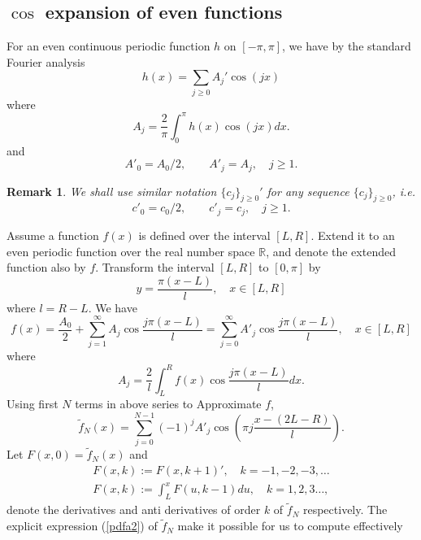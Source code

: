\documentclass[numreferences]{kluwer}    %
\newtheorem{Rem}{Remark}
\begin{document}
\begin{article}
\section{$\cos$ expansion of even functions}
For an even continuous periodic function $h$ on $[-\pi,\pi]$, we
have by the standard Fourier analysis
\[
h(x)={\sum_{j \ge 0}}A_j' \cos(jx)
\]
where
\begin{equation}\label{Aj1}
A_j=\frac{2}{\pi}\int^{\pi}_0 h(x)\cos(jx)dx.
\end{equation}
and
\begin{equation}\label{Ajp}
A'_0=A_0/2,\quad  \quad A'_j=A_j,\quad j\ge 1.
\end{equation}
\begin{Rem}
We shall use similar notation $\{c_j\}_{j\ge 0}'$ for any
sequence $\{c_j\}_{j\ge 0}$, i.e.
\begin{equation}\label{cjp}
c'_0=c_0/2,\quad  \quad c'_j=c_j,\quad j\ge 1.
\end{equation}
\end{Rem}
Assume a function $f(x)$ is defined over the interval $[L, R]$. 
Extend it to an even periodic function over the real number space
$\mathbb{R}$, and denote the extended function also by $f$.   Transform the interval $[L, R]$ to $[0, \pi]$ by
\begin{equation}\label{y}
y=\frac{\pi(x-L)}l,\quad x\in [L,R]
\end{equation}
where $l=R-L$. We have
\begin{equation}\label{fx}
f(x)=\frac{A_0}2+\sum_{j=1}^{\infty}A_j \cos\frac{j\pi(x-L)}l=\sum_{j=0}^{\infty}A'_j \cos\frac{j\pi(x-L)}l,
\quad x\in [L,R]
\end{equation}
where
\begin{equation}\label{Aj2}
A_j=\frac{2}l\int^{R}_L f(x)\cos\frac{j\pi(x-L)}l dx.
\end{equation}
Using first $N$ terms in above series to Approximate $f$, 
\begin{equation}\label{pdfa2}
\tilde{f}_N(x)=\sum_{j=0}^{N-1}(-1)^{j}A'_j \cos(\pi
j\frac{x-(2L-R)}l).
\end{equation}
Let $F(x,0)=\tilde{f}_N(x)$ and
\begin{eqnarray*}
F(x,k):=F(x,k+1)',\quad k=-1,-2,-3,\dots\\
F(x,k):=\int^{x}_{L} F(u,k-1)du, \quad k=1, 2, 3\dots,
\end{eqnarray*}
denote the derivatives and anti derivatives of order $k$ of
$\tilde{f}_N$ respectively. The explicit expression (\ref{pdfa2}) of
$\tilde{f}_N$ make it possible for us to compute effectively

\end{article}
\end{document}

